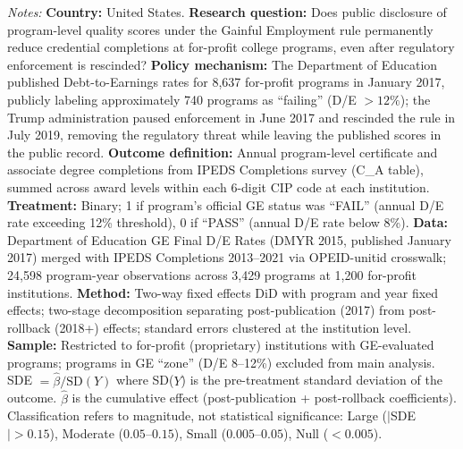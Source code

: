 \begin{tablenotes}[flushleft]\small
\item \textit{Notes:} \textbf{Country:} United States. \textbf{Research question:} Does public disclosure of program-level quality scores under the Gainful Employment rule permanently reduce credential completions at for-profit college programs, even after regulatory enforcement is rescinded? \textbf{Policy mechanism:} The Department of Education published Debt-to-Earnings rates for 8,637 for-profit programs in January 2017, publicly labeling approximately 740 programs as ``failing'' (D/E $> 12\%$); the Trump administration paused enforcement in June 2017 and rescinded the rule in July 2019, removing the regulatory threat while leaving the published scores in the public record. \textbf{Outcome definition:} Annual program-level certificate and associate degree completions from IPEDS Completions survey (C\_A table), summed across award levels within each 6-digit CIP code at each institution. \textbf{Treatment:} Binary; 1 if program's official GE status was ``FAIL'' (annual D/E rate exceeding 12\% threshold), 0 if ``PASS'' (annual D/E rate below 8\%). \textbf{Data:} Department of Education GE Final D/E Rates (DMYR 2015, published January 2017) merged with IPEDS Completions 2013--2021 via OPEID-unitid crosswalk; 24,598 program-year observations across 3,429 programs at 1,200 for-profit institutions. \textbf{Method:} Two-way fixed effects DiD with program and year fixed effects; two-stage decomposition separating post-publication (2017) from post-rollback (2018+) effects; standard errors clustered at the institution level. \textbf{Sample:} Restricted to for-profit (proprietary) institutions with GE-evaluated programs; programs in GE ``zone'' (D/E 8--12\%) excluded from main analysis. SDE $= \hat{\beta} / \text{SD}(Y)$ where SD($Y$) is the pre-treatment standard deviation of the outcome. $\hat{\beta}$ is the cumulative effect (post-publication + post-rollback coefficients). Classification refers to magnitude, not statistical significance: Large ($|$SDE$| > 0.15$), Moderate ($0.05$--$0.15$), Small ($0.005$--$0.05$), Null ($< 0.005$).
\end{tablenotes}

